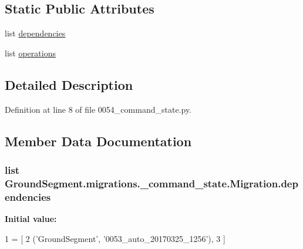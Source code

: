 \subsection*{Static Public Attributes}
\begin{DoxyCompactItemize}
\item 
list \hyperlink{class_ground_segment_1_1migrations_1_10054__command__state_1_1_migration_a8a66892d1bc008d544bb7388f023ae42}{dependencies}
\item 
list \hyperlink{class_ground_segment_1_1migrations_1_10054__command__state_1_1_migration_ae9e43473e39f5df3a98dbd3addfc7e99}{operations}
\end{DoxyCompactItemize}


\subsection{Detailed Description}


Definition at line 8 of file 0054\+\_\+command\+\_\+state.\+py.



\subsection{Member Data Documentation}
\hypertarget{class_ground_segment_1_1migrations_1_10054__command__state_1_1_migration_a8a66892d1bc008d544bb7388f023ae42}{}
\subsubsection[{dependencies}]{\setlength{\rightskip}{0pt plus 5cm}list Ground\+Segment.\+migrations.\+\_\+command\+\_\+state.\+Migration.\+dependencies\hspace{0.3cm}{\ttfamily [static]}}\label{class_ground_segment_1_1migrations_1_10054__command__state_1_1_migration_a8a66892d1bc008d544bb7388f023ae42}
{\bfseries Initial value\+:}
\begin{DoxyCode}
1 = [
2         (\textcolor{stringliteral}{'GroundSegment'}, \textcolor{stringliteral}{'0053\_auto\_20170325\_1256'}),
3     ]
\end{DoxyCode}


